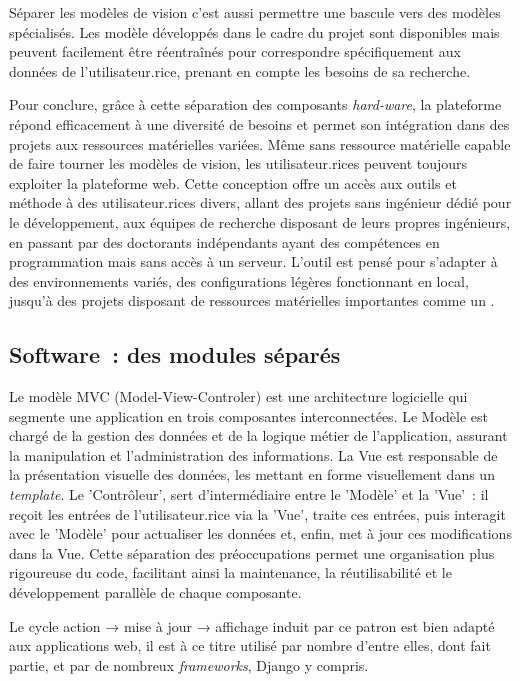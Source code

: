 Séparer les modèles de vision c'est aussi permettre une bascule vers des
modèles spécialisés. Les modèle développés dans le cadre du projet sont
disponibles mais peuvent facilement être réentraînés pour correspondre
spécifiquement aux données de l'utilisateur.rice, prenant en compte les
besoins de sa recherche.

Pour conclure, grâce à cette séparation des composants \textit{hard-ware}, la
plateforme répond efficacement à une diversité de besoins et permet son
intégration dans des projets aux ressources matérielles variées. Même
sans ressource matérielle capable de faire tourner les modèles de
vision, les utilisateur.rices peuvent toujours exploiter la plateforme web.
Cette conception offre un accès aux outils et méthode à des utilisateur.rices
divers, allant des projets sans ingénieur dédié pour le
développement, aux équipes de recherche disposant de leurs propres
ingénieurs, en passant par des doctorants indépendants ayant des
compétences en programmation mais sans accès à un serveur. L'outil est
pensé pour s'adapter à des environnements variés, des configurations
légères fonctionnant en local, jusqu'à des projets disposant de
ressources matérielles importantes comme un \gpu.

\hypertarget{software-des-modules-separes}{%
\subsection{Software~: des modules
séparés}\label{software-des-modules-separes}}

Le modèle MVC (Model-View-Controler) est une architecture logicielle qui
segmente une application en trois composantes interconnectées. Le Modèle
est chargé de la gestion des données et de la logique métier de
l'application, assurant la manipulation et l'administration des
informations. La Vue est responsable de la présentation visuelle des
données, les mettant en forme visuellement dans un \textit{template}. Le
'Contrôleur', sert d'intermédiaire entre le 'Modèle' et la 'Vue'~: il reçoit
les entrées de l'utilisateur.rice via la 'Vue', traite ces entrées, puis
interagit avec le 'Modèle' pour actualiser les données et, enfin, met à
jour ces modifications dans la Vue. Cette séparation des préoccupations
permet une organisation plus rigoureuse du code, facilitant ainsi la
maintenance, la réutilisabilité et le développement parallèle de chaque
composante.

Le cycle action → mise à jour → affichage induit par ce patron est bien
adapté aux applications web, il est à ce titre utilisé par nombre
d'entre elles, dont \eida fait partie, et par de nombreux \textit{frameworks},
Django y compris.

